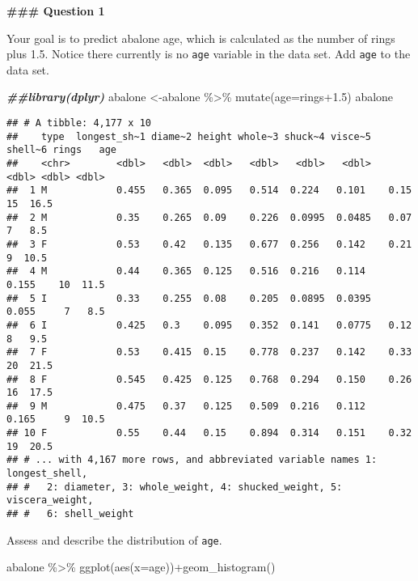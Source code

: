 \documentclass[
]{article}
\newenvironment{Shaded}{\begin{snugshade}}{\end{snugshade}}
\newcommand{\AttributeTok}[1]{\textcolor[rgb]{0.77,0.63,0.00}{#1}}
\newcommand{\DocumentationTok}[1]{\textcolor[rgb]{0.56,0.35,0.01}{\textbf{\textit{#1}}}}
\newcommand{\FloatTok}[1]{\textcolor[rgb]{0.00,0.00,0.81}{#1}}
\newcommand{\FunctionTok}[1]{\textcolor[rgb]{0.00,0.00,0.00}{#1}}
\newcommand{\NormalTok}[1]{#1}
\newcommand{\OtherTok}[1]{\textcolor[rgb]{0.56,0.35,0.01}{#1}}
\newcommand{\SpecialCharTok}[1]{\textcolor[rgb]{0.00,0.00,0.00}{#1}}
\begin{document}
\textbf{\#\#\# Question 1}

Your goal is to predict abalone age, which is calculated as the number
of rings plus 1.5. Notice there currently is no \texttt{age} variable in
the data set. Add \texttt{age} to the data set.

\begin{Shaded}
\begin{Highlighting}[]
\DocumentationTok{\#\#library(dplyr)}
\NormalTok{abalone }\OtherTok{\textless{}{-}}\NormalTok{abalone }\SpecialCharTok{\%\textgreater{}\%}
  \FunctionTok{mutate}\NormalTok{(}\AttributeTok{age=}\NormalTok{rings}\FloatTok{+1.5}\NormalTok{)}
\NormalTok{abalone}
\end{Highlighting}
\end{Shaded}

\begin{verbatim}
## # A tibble: 4,177 x 10
##    type  longest_sh~1 diame~2 height whole~3 shuck~4 visce~5 shell~6 rings   age
##    <chr>        <dbl>   <dbl>  <dbl>   <dbl>   <dbl>   <dbl>   <dbl> <dbl> <dbl>
##  1 M            0.455   0.365  0.095   0.514  0.224   0.101    0.15     15  16.5
##  2 M            0.35    0.265  0.09    0.226  0.0995  0.0485   0.07      7   8.5
##  3 F            0.53    0.42   0.135   0.677  0.256   0.142    0.21      9  10.5
##  4 M            0.44    0.365  0.125   0.516  0.216   0.114    0.155    10  11.5
##  5 I            0.33    0.255  0.08    0.205  0.0895  0.0395   0.055     7   8.5
##  6 I            0.425   0.3    0.095   0.352  0.141   0.0775   0.12      8   9.5
##  7 F            0.53    0.415  0.15    0.778  0.237   0.142    0.33     20  21.5
##  8 F            0.545   0.425  0.125   0.768  0.294   0.150    0.26     16  17.5
##  9 M            0.475   0.37   0.125   0.509  0.216   0.112    0.165     9  10.5
## 10 F            0.55    0.44   0.15    0.894  0.314   0.151    0.32     19  20.5
## # ... with 4,167 more rows, and abbreviated variable names 1: longest_shell,
## #   2: diameter, 3: whole_weight, 4: shucked_weight, 5: viscera_weight,
## #   6: shell_weight
\end{verbatim}

Assess and describe the distribution of \texttt{age}.

\begin{Shaded}
\begin{Highlighting}[]
\NormalTok{abalone }\SpecialCharTok{\%\textgreater{}\%}
  \FunctionTok{ggplot}\NormalTok{(}\FunctionTok{aes}\NormalTok{(}\AttributeTok{x=}\NormalTok{age))}\SpecialCharTok{+}\FunctionTok{geom\_histogram}\NormalTok{()}
\end{Highlighting}
\end{Shaded}
\end{document}
